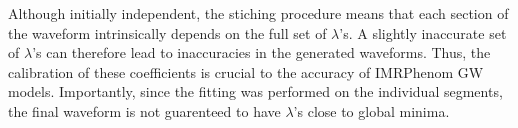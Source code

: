 \documentclass[twocolumn]{aastex631}
\newcommand{\kw}[1]{{\color{rb4}[KW: #1 ]}}
\begin{document}


Although initially independent, the stiching procedure means that each section
of the waveform intrinsically depends on the full set of $\lambda$'s. 
A slightly inaccurate set of $\lambda$'s can therefore lead to inaccuracies in
the generated waveforms. 
Thus, the calibration of these coefficients is crucial to the accuracy
of IMRPhenom GW models. 
Importantly, since the fitting was performed on the individual segments,
the final waveform is not guarenteed to have $\lambda$'s close to global minima.
\end{document}
